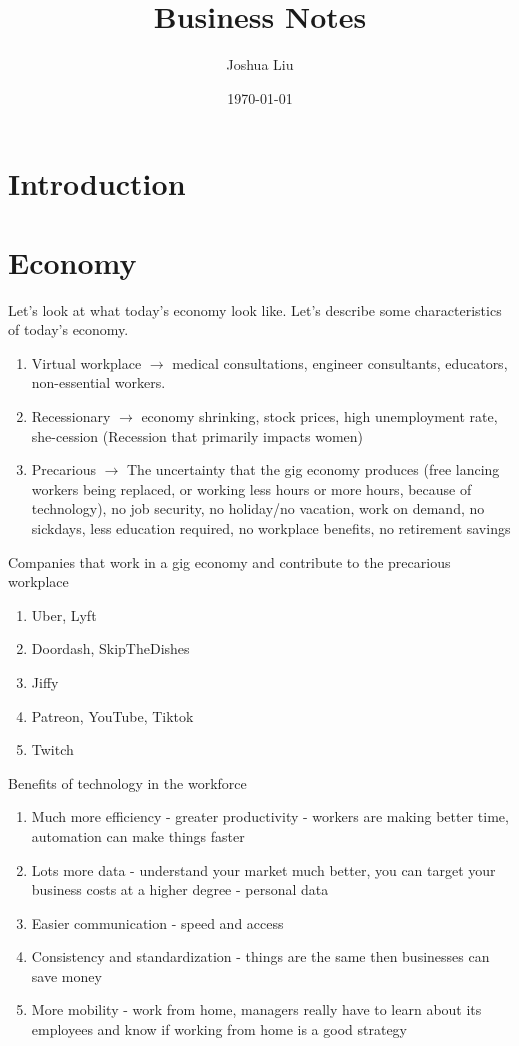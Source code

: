 \documentclass[11pt]{article}
\title{Business Notes}
\author{Joshua Liu}
\date{\today}
\begin{document}
\maketitle



\section{Introduction}
\section{Economy}
Let's look at what today's economy look like. Let's describe some characteristics of today's economy.
\begin{enumerate}
    \setlength{\itemsep}{0pt}
    \setlength{\parskip}{0pt}
    \item Virtual workplace $\rightarrow$ medical consultations, engineer consultants, educators, non-essential workers.
    \item Recessionary $\rightarrow$ economy shrinking, stock prices, high unemployment rate, she-cession (Recession that primarily impacts women)
    \item Precarious $\rightarrow$ The uncertainty that the gig economy produces (free lancing workers being replaced, or working less hours or more hours, because of technology), no job security, no holiday/no vacation, work on demand, no sickdays, less education required, no workplace benefits, no retirement savings
\end{enumerate}

Companies that work in a gig economy and contribute to the precarious workplace
\begin{enumerate}
    \setlength{\itemsep}{0pt}
    \setlength{\parskip}{0pt}
    \item Uber, Lyft
    \item Doordash, SkipTheDishes
    \item Jiffy
    \item Patreon, YouTube, Tiktok
    \item Twitch
\end{enumerate}


Benefits of technology in the workforce

\begin{enumerate}
    \setlength{\itemsep}{0pt}
    \setlength{\parskip}{0pt}
    \item Much more efficiency - greater productivity - workers are making better time, automation can make things faster
    \item Lots more data - understand your market much better, you can target your business costs at a higher degree - personal data
    \item Easier communication - speed and access
    \item Consistency and standardization - things are the same then businesses can save money
    \item More mobility - work from home, managers really have to learn about its employees and know if working from home is a good strategy
\end{enumerate}
\end{document}
